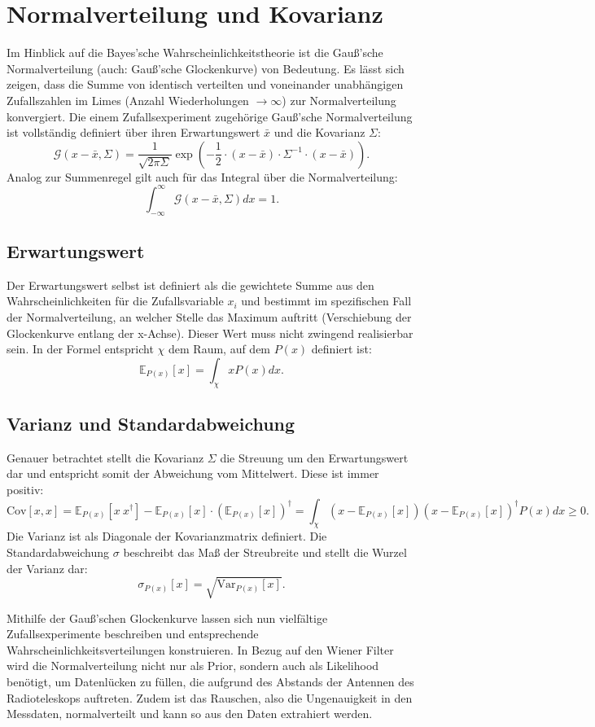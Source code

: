 \section{Normalverteilung und Kovarianz}

Im Hinblick auf die Bayes'sche Wahrscheinlichkeitstheorie ist die Gauß'sche Normalverteilung (auch: Gauß'sche Glockenkurve) von Bedeutung.
Es lässt sich zeigen, dass die Summe von identisch verteilten und voneinander unabhängigen Zufallszahlen im Limes (Anzahl Wiederholungen $\rightarrow \infty$) zur Normalverteilung konvergiert.
Die einem Zufallsexperiment zugehörige Gauß'sche Normalverteilung ist vollständig definiert über ihren Erwartungswert $\bar{x}$ und die Kovarianz $\Sigma$:
\[ \mathcal{G} (x - \bar{x}, \Sigma) = \displaystyle\frac{1}{\sqrt{2 \pi \Sigma}} \exp \left(- \displaystyle\frac{1}{2} \cdot (x - \bar{x}) \cdot \Sigma^{-1} \cdot (x - \bar{x}) \right). \]
Analog zur Summenregel gilt auch für das Integral über die Normalverteilung:
\[ \int_{- \infty}^{\infty} \mathcal{G} (x - \bar{x}, \Sigma) dx = 1. \]

\subsection{Erwartungswert}
Der Erwartungswert selbst ist definiert als die gewichtete Summe aus den Wahrscheinlichkeiten für die Zufallsvariable $x _i$ und bestimmt im spezifischen Fall der Normalverteilung, an welcher Stelle das Maximum auftritt (Verschiebung der Glockenkurve entlang der x-Achse). Dieser Wert muss nicht zwingend realisierbar sein. In der Formel entspricht $\chi$ dem Raum, auf dem $P(x)$ definiert ist:
\[ \mathbb{E} _{P(x)} [x] = \int_{\chi} x P(x) dx .\]

\subsection{Varianz und Standardabweichung}
Genauer betrachtet stellt die Kovarianz $\Sigma$ die Streuung um den Erwartungswert dar und entspricht somit der Abweichung vom Mittelwert. Diese ist immer positiv:
\[ \text{Cov} [x, x] = \mathbb{E} _{P(x)} [x \ x^{\dagger}] - \mathbb{E} _{P(x)} [x] \cdot (\mathbb{E} _{P(x)} [x])^{\dagger} = \int_ {\chi} (x - \mathbb{E} _{P(x)} [x]) (x - \mathbb{E} _{P(x)} [x])^{\dagger} P(x) dx \geq 0. \]
Die Varianz ist als Diagonale der Kovarianzmatrix definiert. Die Standardabweichung $\sigma$ beschreibt das Maß der Streubreite und stellt die Wurzel der Varianz dar:
\[ \sigma _{P(x)} [x] = \sqrt{\text{Var} _{P(x)} [x]}. \]

Mithilfe der Gauß'schen Glockenkurve lassen sich nun vielfältige Zufallsexperimente beschreiben und entsprechende Wahrscheinlichkeitsverteilungen konstruieren. In Bezug auf den Wiener Filter wird die Normalverteilung nicht nur als Prior, sondern auch als Likelihood benötigt, um Datenlücken zu füllen, die aufgrund des Abstands der Antennen des Radioteleskops auftreten. Zudem ist das Rauschen, also die Ungenauigkeit in den Messdaten, normalverteilt und kann so aus den Daten extrahiert werden.
